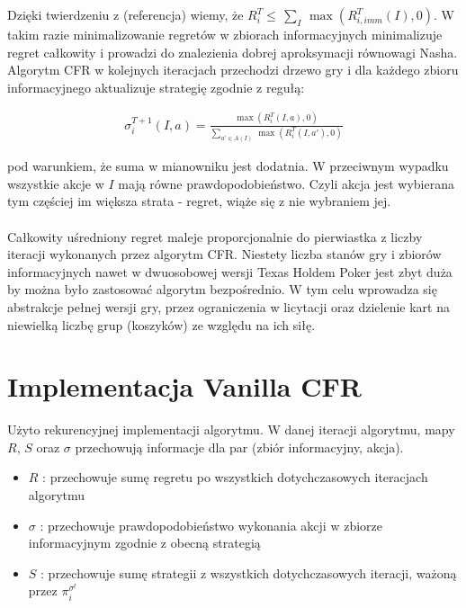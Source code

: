 \documentclass[licencjacka]{pracamgr}
\begin{document}
\noindent
Dzięki twierdzeniu z (referencja) wiemy, że $R_i^T \leq \, \sum_{I} \, \max(R_{i, imm}^T(I), 0)$. W takim razie
minimalizowanie regretów w zbiorach informacyjnych minimalizuje regret całkowity i prowadzi do znalezienia
dobrej aproksymacji równowagi Nasha. \\

\noindent
Algorytm CFR w kolejnych iteracjach przechodzi drzewo gry i dla każdego zbioru informacyjnego aktualizuje strategię
zgodnie z regułą:

\begin{align*}
\sigma_i^{T+1} (I, a) = \frac{\max(R_i^T(I, a), 0)}{\sum\limits_{a' \in A(I)} \, \max(R_i^T(I, a'), 0)}
\end{align*}

\noindent
pod warunkiem, że suma w mianowniku jest dodatnia. W przeciwnym wypadku wszystkie akcje w $I$ mają równe prawdopodobieństwo.
Czyli akcja jest wybierana tym częściej im większa strata - regret, wiąże się z nie wybraniem jej.\\\\

\noindent
Całkowity uśredniony regret maleje proporcjonalnie do pierwiastka z liczby iteracji wykonanych przez algorytm CFR. Niestety
liczba stanów gry i zbiorów informacyjnych nawet w dwuosobowej wersji Texas Holdem Poker jest zbyt duża by można było
zastosować algorytm bezpośrednio. W tym celu wprowadza się abstrakcje pełnej wersji gry, przez ograniczenia w licytacji
oraz dzielenie kart na niewielką liczbę grup (koszyków) ze względu na ich siłę. \\

\section{Implementacja Vanilla CFR}

Użyto rekurencyjnej implementacji algorytmu. W danej iteracji algorytmu, mapy $R$, $S$ oraz $\sigma$ przechowują informacje
dla par (zbiór informacyjny, akcja).
\begin{itemize}
\item $R$ : przechowuje sumę regretu po wszystkich dotychczasowych iteracjach algorytmu
\item $\sigma$ : przechowuje prawdopodobieństwo wykonania akcji w zbiorze informacyjnym zgodnie z obecną strategią
\item $S$ : przechowuje sumę strategii z wszystkich dotychczasowych iteracji, ważoną przez $\pi_i^{\sigma^t}$
\end{itemize}
\end{document}
